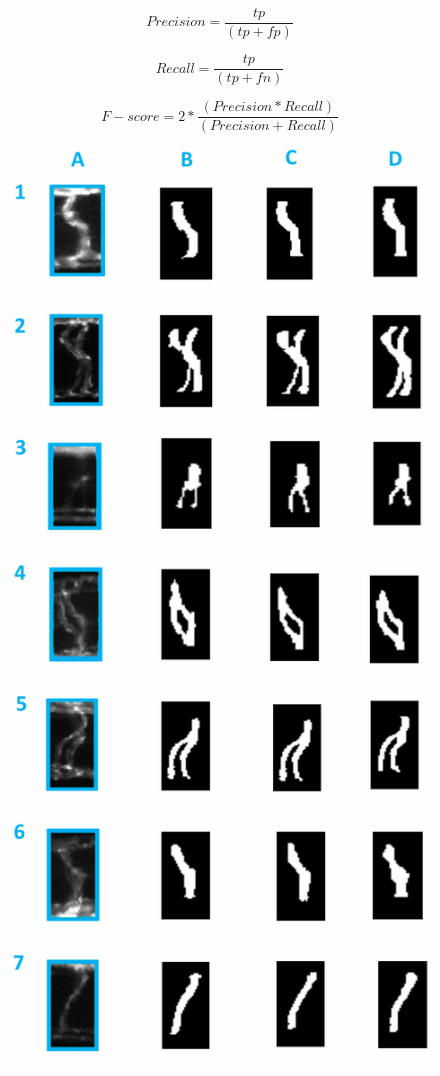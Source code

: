 \begin{equation}
Precision = \frac{tp}{(tp + fp)}
\end{equation}

\begin{equation}
Recall = \frac{tp}{(tp + fn)}
\end{equation}

\begin{equation}
F - score = 2*\frac{(Precision * Recall)}{(Precision + Recall)}
\end{equation}

 \begin{figure}[H] 
 \begin{center}
    \includegraphics[scale=0.5]{figure/isvSegmentation.png}

\end{center}
\end{figure}
